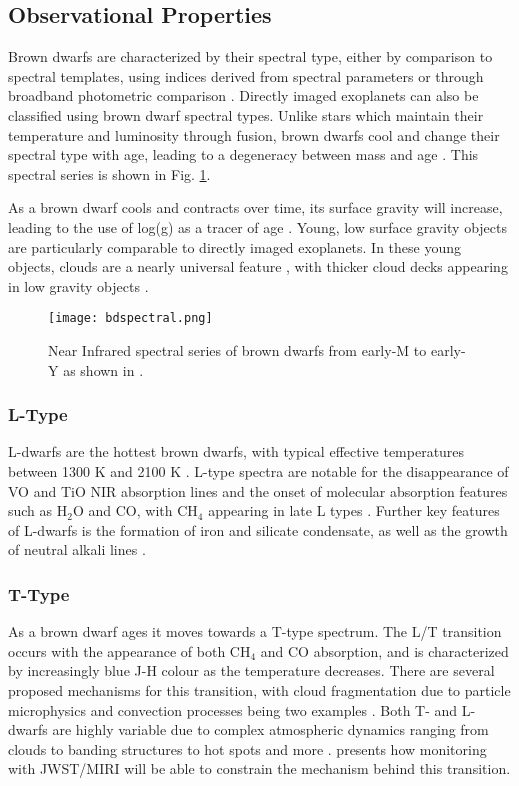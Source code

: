 \subsection{Observational Properties}
Brown dwarfs are characterized by their spectral type, either by comparison to spectral templates, using indices derived from spectral parameters or through broadband photometric comparison \parencite{Helling2014}.
Directly imaged exoplanets can also be classified using brown dwarf spectral types.
Unlike stars which maintain their temperature and luminosity through fusion, brown dwarfs cool and change their spectral type with age, leading to a degeneracy between mass and age \parencite{Burrows2001}.
This spectral series is shown in Fig. \ref{fig:bdspec}.

As a brown dwarf cools and contracts over time, its surface gravity will increase, leading to the use of log(g) as a tracer of age \parencite{Manjavacas2014}.
Young, low surface gravity objects are particularly comparable to directly imaged exoplanets.
In these young objects, clouds are a nearly universal feature \parencite{Cooper2003,Helling2014}, with thicker cloud decks appearing in low gravity objects \parencite{Helling2014}.

\begin{figure}[t]
	\texttt{[image: bdspectral.png]}
	\caption[Brown Dwarf Spectra]{Near Infrared spectral series of brown dwarfs from early-M to early-Y as shown in \parencite{Helling2014}.}
	\label{fig:bdspec}
\end{figure}

\subsubsection{L-Type}
L-dwarfs are the hottest brown dwarfs, with typical effective temperatures between 1300 K and 2100 K \parencite{Burrows2001}.
L-type spectra are notable for the disappearance of VO and TiO NIR absorption lines and the onset of molecular absorption features such as H$_{2}$O and CO, with CH$_{4}$ appearing in late L types \parencite{Manjavacas2014}.
Further key features of L-dwarfs is the formation of iron and silicate condensate, as well as the growth of neutral alkali lines \parencite{Burrows2001}.
\subsubsection{T-Type}
As a brown dwarf ages it moves towards a T-type spectrum. 
The L/T transition occurs  with the appearance of both CH$_{4}$ and CO absorption, and is characterized by increasingly blue J-H colour as the temperature decreases.
There are several proposed mechanisms for this transition, with cloud fragmentation due to particle microphysics \parencite{Burningham2017} and convection processes being two examples \parencite{Tremblin2015}.
Both T- and L-dwarfs are highly variable due to complex atmospheric dynamics ranging from clouds to banding structures to hot spots and more \parencite{Biller2017}.
\parencite{Vos2019} presents how monitoring with JWST/MIRI will be able to constrain the mechanism behind this transition.
